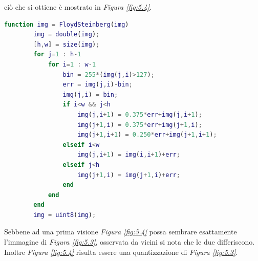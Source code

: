 \documentclass{subfiles}
\begin{document}
ciò che si ottiene è mostrato in \emph{Figura \ref{fig:5.4}}.
\begin{center}
    \begin{lstlisting}[language = MATLAB]
        function img = FloydSteinberg(img)
        img = double(img);
        [h,w] = size(img);
        for j=1 : h-1
            for i=1 : w-1
                bin = 255*(img(j,i)>127);
                err = img(j,i)-bin;
                img(j,i) = bin;
                if i<w && j<h
                    img(j,i+1) = 0.375*err+img(j,i+1);
                    img(j+1,i) = 0.375*err+img(j+1,i);
                    img(j+1,i+1) = 0.250*err+img(j+1,i+1);
                elseif i<w
                    img(j,i+1) = img(i,i+1)+err;
                elseif j<h
                    img(j+1,i) = img(j+1,i)+err;
                end
            end
        end
        img = uint8(img);
    \end{lstlisting}
\end{center}
Sebbene ad una prima visione \emph{Figura \ref{fig:5.4}} possa sembrare esattamente l'immagine di \emph{Figura \ref{fig:5.3}},
osservata da vicini si nota che le due differiscono. Inoltre \emph{Figura \ref{fig:5.4}} risulta essere una quantizzazione di \emph{Figura \ref{fig:5.3}}.
\end{document}
